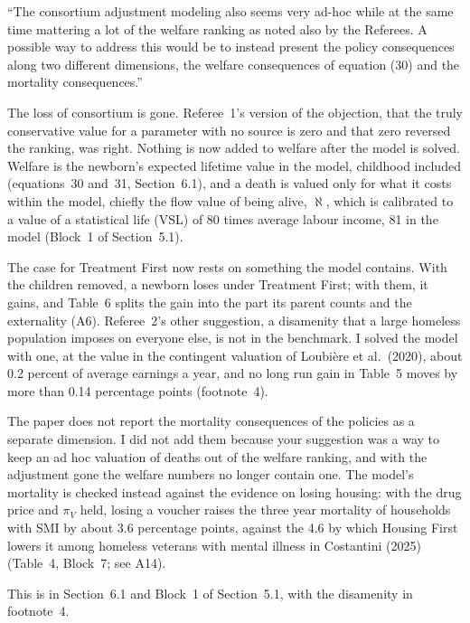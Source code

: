\documentclass[11pt]{article}
\begin{document}
\begin{referee}
``The consortium adjustment modeling also seems very ad-hoc while at the same
time mattering a lot of the welfare ranking as noted also by the Referees. A
possible way to address this would be to instead present the policy consequences
along two different dimensions, the welfare consequences of equation (30) and the
mortality consequences.''
\end{referee}
\begin{response}
\concede The loss of consortium is gone. Referee~1's version of the objection, that
the truly conservative value for a parameter with no source is zero and that zero
reversed the ranking, was right. Nothing is now added to welfare after the model is
solved. Welfare is the newborn's expected lifetime value in the model, childhood
included (equations~30 and~31, Section~6.1), and a death is valued only for what it
costs within the model, chiefly the flow value of being alive, $\aleph$, which is
calibrated to a value of a statistical life (VSL) of 80 times average labour
income, 81 in the model (Block~1 of Section~5.1).

The case for Treatment First now rests on something the model contains. With the
children removed, a newborn loses under Treatment First; with them, it gains, and
Table~6 splits the gain into the part its parent counts and the externality (A6).
Referee~2's other suggestion, a disamenity that a large homeless population imposes
on everyone else, is not in the benchmark. I solved the model with one, at the value
in the contingent valuation of Loubi\`ere et al.\ (2020), about 0.2 percent of
average earnings a year, and no long run gain in Table~5 moves by more than 0.14
percentage points (footnote~4).

\open The paper does not report the mortality consequences of the policies as a
separate dimension. I did not add them because your suggestion was a way to keep an
ad hoc valuation of deaths out of the welfare ranking, and with the adjustment gone
the welfare numbers no longer contain one. The model's mortality is checked instead
against the evidence on losing housing: with the drug price and $\pi_V$ held, losing
a voucher raises the three year mortality of households with SMI by about 3.6
percentage points, against the 4.6 by which Housing First lowers it among homeless
veterans with mental illness in Costantini (2025) (Table~4, Block~7; see A14).

This is in Section~6.1 and Block~1 of Section~5.1, with the disamenity in
footnote~4.
\end{response}
\end{document}
